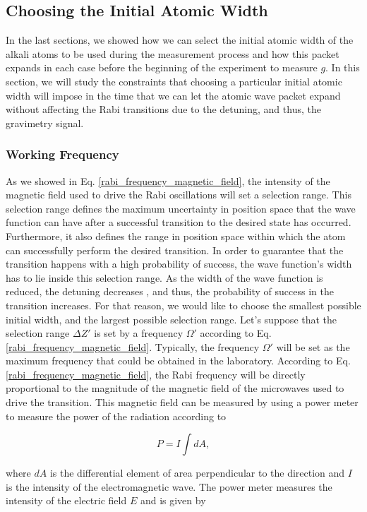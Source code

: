 \documentclass{article}
\begin{document}
\subsection{Choosing the Initial Atomic Width}
In the last sections, we showed how we can select the initial atomic width of the alkali atoms to be used during the measurement process and how this packet expands in each case before the beginning of the experiment to measure $g$. In this section, we will study the constraints that choosing a particular initial atomic width will impose in the time that we can let the atomic wave packet expand without affecting the Rabi transitions due to the detuning, and thus, the gravimetry signal.

\subsubsection{Working Frequency}
As we showed in Eq. \ref{rabi_frequency_magnetic_field}, the intensity of the magnetic field used to drive the Rabi oscillations will set a selection range. This selection range defines the maximum uncertainty in position space that the wave function can have after a successful transition to the desired state has occurred. Furthermore, it also defines the range in position space within which the atom can successfully perform the desired transition. In order to guarantee that the transition happens with a high probability of success, the wave function's width has to lie inside this selection range. As the width of the wave function is reduced, the detuning decreases , and thus, the probability of success in the transition increases. For that reason, we would like to choose the smallest possible initial width, and the largest possible selection range. Let's suppose that the selection range $\Delta Z'$ is set by a frequency $\Omega'$ according to Eq. \ref{rabi_frequency_magnetic_field}.
Typically, the frequency $\Omega'$ will be set as the maximum frequency that could be obtained in the laboratory. According to Eq. \ref{rabi_frequency_magnetic_field}, the Rabi frequency will be directly proportional to the magnitude of the magnetic field of the microwaves used to drive the transition. This magnetic field can be measured by using a power meter to measure the power of the radiation according to

\begin{equation}
    P = I \int dA,
\end{equation}

where $dA$ is the differential element of area perpendicular to the direction and $I$ is the intensity of the electromagnetic wave. The power meter measures the intensity of the electric field $E$ and is given by
\end{document}
